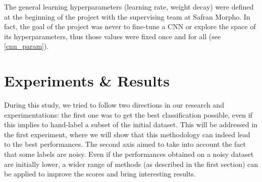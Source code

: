 \documentclass[a4paper]{article}
\begin{document}
    The general learning hyperparameters (learning rate, weight decay) were defined at the beginning of the project with the supervising team at Safran Morpho. In fact, the goal of the project was never to fine-tune a CNN or explore the space of its hyperparameters, thus those values were fixed once and for all (see \ref{cnn_param}).

\section{Experiments \& Results}\label{sec:4}
    During this study, we tried to follow two directions in our research and experimentations: the first one was to get the best classification possible, even if this implies to hand-label a subset of the initial dataset. This will be addressed in the first experiment, where we will show that this methodology can indeed lead to the best performances. The second axis aimed to take into account the fact that some labels are noisy. Even if the performances obtained on a noisy dataset are initially lower, a wider range of methods (as described in the first section) can be applied to improve the scores and bring interesting results.
\end{document}
